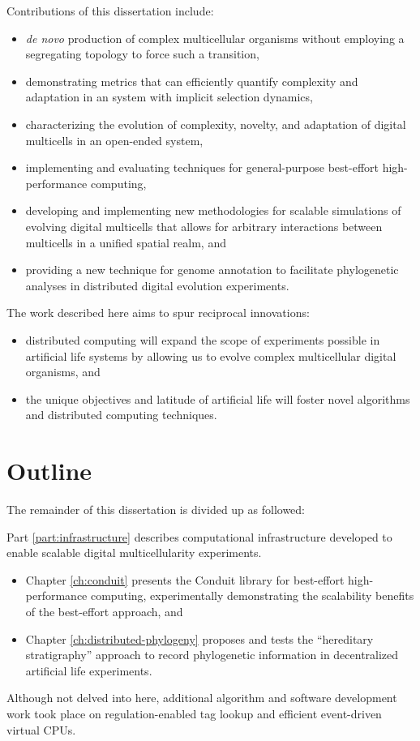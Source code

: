 Contributions of this dissertation include:
\begin{itemize}
\item \textit{de novo} production of complex multicellular organisms without employing a segregating topology to force such a transition,
\item demonstrating metrics that can efficiently quantify complexity and adaptation in an system with implicit selection dynamics,
\item characterizing the evolution of complexity, novelty, and adaptation of digital multicells in an open-ended system,
\item implementing and evaluating techniques for general-purpose best-effort high-performance computing,
\item developing and implementing new methodologies for scalable simulations of evolving digital multicells that allows for arbitrary interactions between multicells in a unified spatial realm, and
\item providing a new technique for genome annotation to facilitate phylogenetic analyses in distributed digital evolution experiments.
\end{itemize}

The work described here aims to spur reciprocal innovations:
\begin{itemize}
\item distributed computing will expand the scope of experiments possible in artificial life systems by allowing us to evolve complex multicellular digital organisms, and
\item the unique objectives and latitude of artificial life will foster novel algorithms and distributed computing techniques.
\end{itemize}

\section{Outline}

The remainder of this dissertation is divided up as followed:

Part \ref{part:infrastructure} describes computational infrastructure developed to enable scalable digital multicellularity experiments.
\begin{itemize}
\item Chapter \ref{ch:conduit} presents the Conduit library for best-effort high-performance computing, experimentally demonstrating the scalability benefits of the best-effort approach, and
\item Chapter \ref{ch:distributed-phylogeny} proposes and tests the ``hereditary stratigraphy'' approach to record phylogenetic information in decentralized artificial life experiments.
\end{itemize}
Although not delved into here, additional algorithm and software development work took place on regulation-enabled tag lookup and efficient event-driven virtual CPUs.

